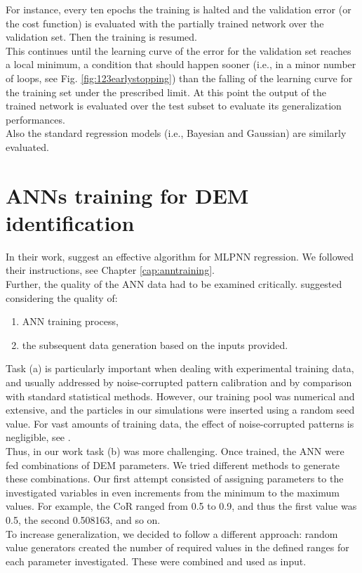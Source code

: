 For instance, every ten epochs the training is halted and the validation error
(or the cost function) is evaluated with the partially trained network over the
validation set.
Then the training is resumed. \\

This continues until the learning curve of the error for the validation set
reaches a local minimum, a condition that should happen sooner (i.e., in a
minor number of loops, see Fig. \ref{fig:123earlystopping}) than the falling of
the learning curve for the training set under the prescribed limit.
At this point the output of the trained network is evaluated over the test
subset to evaluate its generalization performances.\\
Also the standard regression models (i.e., Bayesian and Gaussian) are similarly
evaluated.

\section{ANNs training for DEM identification}
\label{sec:annstrainingfordemidentification}

In their work, \citet{RefWorks:150} suggest an effective algorithm for
\acs{MLPNN} regression. We followed their instructions, see Chapter
\ref{cap:anntraining}. \\
Further, the quality of the \acs{ANN} data had to be examined critically. 
\citet{RefWorks:158} 
suggested considering the quality of:
\begin{enumerate}[label=(\alph*)]
  \item {\acs{ANN} training process,}
  \item {the subsequent data generation based on the inputs provided.}
\end{enumerate}

Task (a) is particularly important
when dealing with experimental training data, and
usually addressed
by noise-corrupted pattern calibration
and by comparison with standard statistical methods.
However, our training pool was numerical and extensive, 
and the particles in our simulations were inserted using a random
seed value.
For vast amounts of training data, the effect of noise-corrupted patterns is
negligible, see \citet{RefWorks:158, RefWorks:188}. \\
Thus, in our work task (b) was more challenging.
Once trained, the \acs{ANN} were fed
combinations of \acs{DEM} parameters. 
We tried different methods to generate these combinations. 
Our first attempt consisted of assigning parameters to the investigated
variables in even increments from the minimum to the maximum values. 
For example, the \acs{CoR} ranged from 0.5 to 0.9, and thus the first value was
0.5, the second 0.508163, and so on. \\
To increase generalization, we decided to follow a different approach: 
random value generators created the number of required values in the defined
ranges for each parameter investigated.
These were combined and used as input.\\

